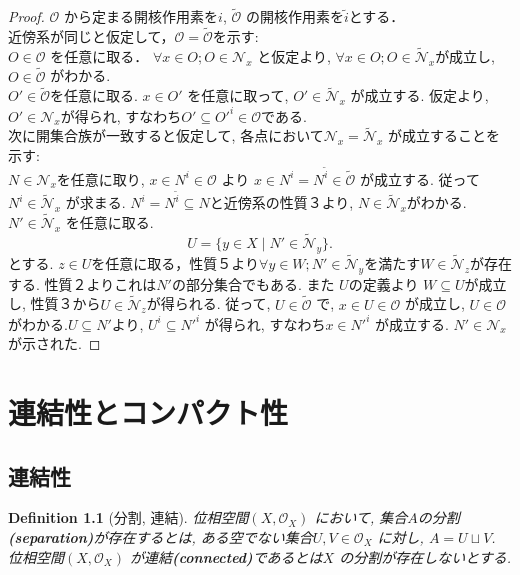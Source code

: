 \documentclass[lualatex]{ltjsbook}
\newtheorem{definition}[theorem]{Definition}
\theoremstyle{remark}
\theoremstyle{plain}
\begin{document}
\begin{proof}
	$\mathcal{O}$ から定まる開核作用素を$i$,  $\tilde{\mathcal{O}}$ の開核作用素を$\tilde{i}$とする．\\
	近傍系が同じと仮定して，$\mathcal{O} = \tilde{\mathcal{O}}$を示す: \\
	$O \in \mathcal{O}$ を任意に取る．
	$\forall x \in O; O \in \mathcal{N}_x$ と仮定より, $\forall x \in O; O \in  \mathcal{\tilde{N}}_x$が成立し, $O \in \tilde{\mathcal{O}}$ がわかる.\\
	$O' \in  \tilde{\mathcal{O}}$を任意に取る. 
	$x \in O'$ を任意に取って, $O' \in  \mathcal{\tilde{N}}_x$ が成立する.
	仮定より, $O' \in \mathcal{N}_x$が得られ, 
すなわち$ O' \subseteq  O'^{i} \in \mathcal{O}$である.\\
	次に開集合族が一致すると仮定して, 各点において$\mathcal{N}_x = \mathcal{\tilde{N}}_x$ が成立することを示す:\\
	$N \in \mathcal{N}_x$を任意に取り, $x \in N^{i} \in \mathcal{O}$ より
	$x \in  N^{i} = N^{\tilde{i}}\in  \tilde{\mathcal{O}}$ が成立する. 
	従って$N^{i} \in \mathcal{\tilde{N}}_x$ が求まる.
	$N^{i} = N^{\tilde{i}} \subseteq N$と近傍系の性質３より, $N \in \mathcal{\tilde{N}}_x$がわかる.\\
	$N' \in \mathcal{\tilde{N}}_x$ を任意に取る. 
	\[
		U =\{y \in X  \mid N' \in \mathcal{\tilde{N}}_y\} 
	.\] 
	とする. $z \in U$を任意に取る，性質５より$\forall y \in W; N' \in \mathcal{\tilde{N}}_y$を満たす$W \in \mathcal{\tilde{N}}_z$が存在する. 性質２よりこれは$N'$の部分集合でもある. また $U$の定義より $W \subseteq U$が成立し, 性質３から$U \in \mathcal{\tilde{N}}_z$が得られる. 従って, $U \in \tilde{\mathcal{O}}$ で, $x \in U \in \mathcal{O}$ が成立し, $U \in \mathcal{O}$ がわかる.$U \subseteq N'$より, $U^{i} \subseteq N'^{i}$ が得られ, すなわち$x \in N'^{i}$ が成立する. $N' \in \mathcal{N}_x$が示された.
\end{proof}

\chapter{連結性とコンパクト性}%
\label{cha:連結性とコンパクト性}


\section{連結性}

\begin{definition}[分割, 連結]
	位相空間$\left( X , \mathcal{O}_X \right) $ において, 集合$A$の分割\textbf{(separation)}が存在するとは, ある空でない集合$U,V \in \mathcal{O}_X$ に対し, $A=U \sqcup   V $. 位相空間$\left( X,\mathcal{O}_X \right) $ が連結\textbf{(connected)}であるとは$X$ の分割が存在しないとする.
\end{definition} 
\end{document}
